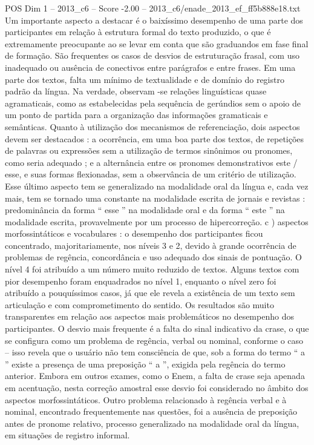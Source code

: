 \begin{textsample}{POS Dim 1 – 2013\_c6 – Score -2.00 – 2013\_c6/enade\_2013\_ef\_ff5b888e18.txt}
Um importante aspecto a destacar é o baixíssimo desempenho de uma parte dos participantes em relação à estrutura formal do texto produzido, o que é extremamente preocupante ao se levar em conta que são graduandos em fase final de formação.
São frequentes os casos de desvios de estruturação frasal, com uso inadequado ou ausência de conectivos entre parágrafos e entre frases.
Em uma parte dos textos, falta um mínimo de textualidade e de domínio do registro padrão da língua.
Na verdade, observam -se relações linguísticas quase agramaticais, como as estabelecidas pela sequência de gerúndios sem o apoio de um ponto de partida para a organização das informações gramaticais e semânticas.
Quanto à utilização dos mecanismos de referenciação, dois aspectos devem ser destacados : a ocorrência, em uma boa parte dos textos, de repetições de palavras ou expressões sem a utilização de termos sinônimos ou pronomes, como seria adequado ; e a alternância entre os pronomes demonstrativos este / esse, e suas formas flexionadas, sem a observância de um critério de utilização.
Esse último aspecto tem se generalizado na modalidade oral da língua e, cada vez mais, tem se tornado uma constante na modalidade escrita de jornais e revistas : predominância da forma “ esse ” na modalidade oral e da forma “ este ” na modalidade escrita, provavelmente por um processo de hipercorreção. c ) aspectos morfossintáticos e vocabulares : o desempenho dos participantes ficou concentrado, majoritariamente, nos níveis 3 e 2, devido à grande ocorrência de problemas de regência, concordância e uso adequado dos sinais de pontuação.
O nível 4 foi atribuído a um número muito reduzido de textos.
Alguns textos com pior desempenho foram enquadrados no nível 1, enquanto o nível zero foi atribuído a pouquíssimos casos, já que ele revela a existência de um texto sem articulação e com comprometimento do sentido.
Os resultados são muito transparentes em relação aos aspectos mais problemáticos no desempenho dos participantes.
O desvio mais frequente é a falta do sinal indicativo da crase, o que se configura como um problema de regência, verbal ou nominal, conforme o caso – isso revela que o usuário não tem consciência de que, sob a forma do termo “ a ” existe a presença de uma preposição “ a ”, exigida pela regência do termo anterior.
Embora em outros exames, como o Enem, a falta de crase seja apenada em acentuação, nesta correção amostral esse desvio foi considerado no âmbito dos aspectos morfossintáticos.
Outro problema relacionado à regência verbal e à nominal, encontrado frequentemente nas questões, foi a ausência de preposição antes de pronome relativo, processo generalizado na modalidade oral da língua, em situações de registro informal.

\end{textsample}
